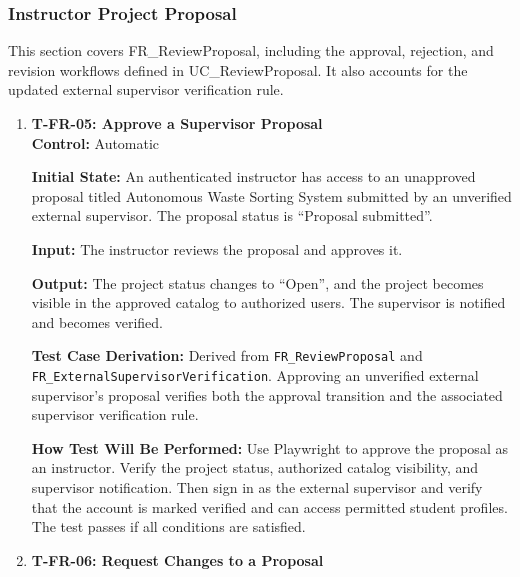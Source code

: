 \documentclass[12pt, titlepage]{article}
\begin{document}
\subsubsection{Instructor Project Proposal}


This section covers FR\_ReviewProposal, including the approval, rejection, and revision workflows defined in UC\_ReviewProposal. It also accounts for the updated external supervisor verification rule.

\begin{enumerate}

\item \label{T-FR-05}\textbf{T-FR-05: Approve a Supervisor Proposal}\\

\textbf{Control:} Automatic

\textbf{Initial State:} An authenticated instructor has access to an unapproved proposal titled Autonomous Waste Sorting System submitted by an unverified external supervisor. The proposal status is ``Proposal submitted''.

\textbf{Input:} The instructor reviews the proposal and approves it.

\textbf{Output:} The project status changes to ``Open'', and the project becomes visible in the approved catalog to authorized users. The supervisor is notified and becomes verified.

\textbf{Test Case Derivation:} Derived from \texttt{FR\_ReviewProposal} and \texttt{FR\_ExternalSupervisorVerification}. Approving an unverified external supervisor's proposal verifies both the approval transition and the associated supervisor verification rule.

\textbf{How Test Will Be Performed:} Use Playwright to approve the proposal as an instructor. Verify the project status, authorized catalog visibility, and supervisor notification. Then sign in as the external supervisor and verify that the account is marked verified and can access permitted student profiles. The test passes if all conditions are satisfied.

\item \label{T-FR-06}\textbf{T-FR-06: Request Changes to a Proposal}\\


\end{enumerate}
\end{document}
